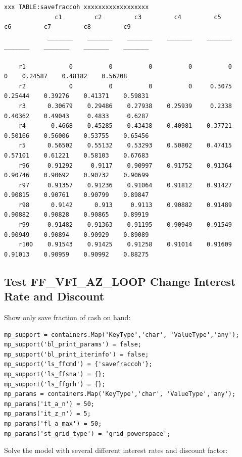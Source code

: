 \documentclass[
]{book}
\begin{document}
\begin{verbatim}
xxx TABLE:savefraccoh xxxxxxxxxxxxxxxxxx
              c1         c2         c3         c4         c5         c6         c7         c8         c9   
            _______    _______    _______    _______    _______    _______    _______    _______    _______

    r1            0          0          0          0          0          0    0.24587    0.48182    0.56208
    r2            0          0          0          0     0.3075    0.25444    0.39276    0.41371    0.59831
    r3      0.30679    0.29486    0.27938    0.25939     0.2338    0.40362    0.49043     0.4833     0.6287
    r4       0.4668    0.45285    0.43438    0.40981    0.37721    0.50166    0.56006    0.53755    0.65456
    r5      0.56502    0.55132    0.53293    0.50802    0.47415    0.57101    0.61221    0.58103    0.67683
    r96     0.91292     0.9117    0.90997    0.91752    0.91364    0.90746    0.90692    0.90732    0.90699
    r97     0.91357    0.91236    0.91064    0.91812    0.91427    0.90815    0.90761    0.90799    0.89847
    r98      0.9142      0.913     0.9113    0.90882    0.91489    0.90882    0.90828    0.90865    0.89919
    r99     0.91482    0.91363    0.91195    0.90949    0.91549    0.90949    0.90894    0.90929    0.89089
    r100    0.91543    0.91425    0.91258    0.91014    0.91609    0.91013    0.90959    0.90992    0.88275
\end{verbatim}

\hypertarget{test-ff_vfi_az_loop-change-interest-rate-and-discount}{%
\subsection{Test FF\_VFI\_AZ\_LOOP Change Interest Rate and Discount}\label{test-ff_vfi_az_loop-change-interest-rate-and-discount}}

Show only save fraction of cash on hand:

\begin{verbatim}
mp_support = containers.Map('KeyType','char', 'ValueType','any');
mp_support('bl_print_params') = false;
mp_support('bl_print_iterinfo') = false;
mp_support('ls_ffcmd') = {'savefraccoh'};
mp_support('ls_ffsna') = {};
mp_support('ls_ffgrh') = {};
mp_params = containers.Map('KeyType','char', 'ValueType','any');
mp_params('it_a_n') = 50;
mp_params('it_z_n') = 5;
mp_params('fl_a_max') = 50;
mp_params('st_grid_type') = 'grid_powerspace';
\end{verbatim}

Solve the model with several different interest rates and discount
factor:
\end{document}
